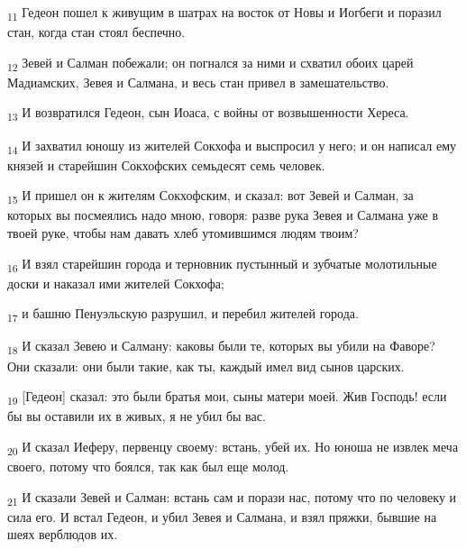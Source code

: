 \begin{tcolorbox}
\textsubscript{11} Гедеон пошел к живущим в шатрах на восток от Новы и Иогбеги и поразил стан, когда стан стоял беспечно.
\end{tcolorbox}
\begin{tcolorbox}
\textsubscript{12} Зевей и Салман побежали; он погнался за ними и схватил обоих царей Мадиамских, Зевея и Салмана, и весь стан привел в замешательство.
\end{tcolorbox}
\begin{tcolorbox}
\textsubscript{13} И возвратился Гедеон, сын Иоаса, с войны от возвышенности Хереса.
\end{tcolorbox}
\begin{tcolorbox}
\textsubscript{14} И захватил юношу из жителей Сокхофа и выспросил у него; и он написал ему князей и старейшин Сокхофских семьдесят семь человек.
\end{tcolorbox}
\begin{tcolorbox}
\textsubscript{15} И пришел он к жителям Сокхофским, и сказал: вот Зевей и Салман, за которых вы посмеялись надо мною, говоря: разве рука Зевея и Салмана уже в твоей руке, чтобы нам давать хлеб утомившимся людям твоим?
\end{tcolorbox}
\begin{tcolorbox}
\textsubscript{16} И взял старейшин города и терновник пустынный и зубчатые молотильные доски и наказал ими жителей Сокхофа;
\end{tcolorbox}
\begin{tcolorbox}
\textsubscript{17} и башню Пенуэльскую разрушил, и перебил жителей города.
\end{tcolorbox}
\begin{tcolorbox}
\textsubscript{18} И сказал Зевею и Салману: каковы были те, которых вы убили на Фаворе? Они сказали: они были такие, как ты, каждый имел вид сынов царских.
\end{tcolorbox}
\begin{tcolorbox}
\textsubscript{19} [Гедеон] сказал: это были братья мои, сыны матери моей. Жив Господь! если бы вы оставили их в живых, я не убил бы вас.
\end{tcolorbox}
\begin{tcolorbox}
\textsubscript{20} И сказал Иеферу, первенцу своему: встань, убей их. Но юноша не извлек меча своего, потому что боялся, так как был еще молод.
\end{tcolorbox}
\begin{tcolorbox}
\textsubscript{21} И сказали Зевей и Салман: встань сам и порази нас, потому что по человеку и сила его. И встал Гедеон, и убил Зевея и Салмана, и взял пряжки, бывшие на шеях верблюдов их.
\end{tcolorbox}
